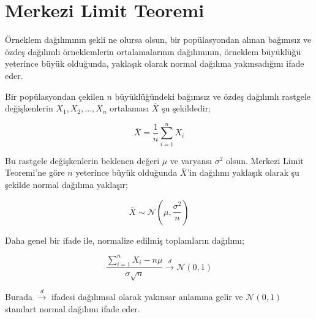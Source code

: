 \section{Merkezi Limit Teoremi}
Örneklem dağılımının şekli ne olursa olsun, bir popülasyondan alınan bağımsız ve özdeş dağılımlı örneklemlerin ortalamalarının dağılımının, örneklem büyüklüğü yeterince büyük olduğunda, yaklaşık olarak normal dağılıma yakınsadığını ifade eder. 

Bir popülasyondan çekilen $n$ büyüklüğündeki bağımsız ve özdeş dağılımlı rastgele değişkenlerin $X_1, X_2, ..., X_n$ ortalaması $\bar{X}$ şu şekildedir;

\[ \bar{X} = \frac{1}{n} \sum_{i=1}^{n} X_i \]

Bu rastgele değişkenlerin beklenen değeri $\mu$ ve varyansı $\sigma^2$ olsun. Merkezi Limit Teoremi'ne göre $n$ yeterince büyük olduğunda $\bar{X}$'in dağılımı yaklaşık olarak şu şekilde normal dağılıma yaklaşır;

\[ \bar{X} \sim \mathcal{N}\left(\mu, \frac{\sigma^2}{n}\right) \]

Daha genel bir ifade ile, normalize edilmiş toplamların dağılımı;

\[ \frac{\sum_{i=1}^{n} X_i - n\mu}{\sigma\sqrt{n}} \xrightarrow{d} \mathcal{N}(0, 1) \]

Burada $\xrightarrow{d}$ ifadesi dağılımsal olarak yakınsar anlamına gelir ve $\mathcal{N}(0, 1)$ standart normal dağılımı ifade eder.

\newpage